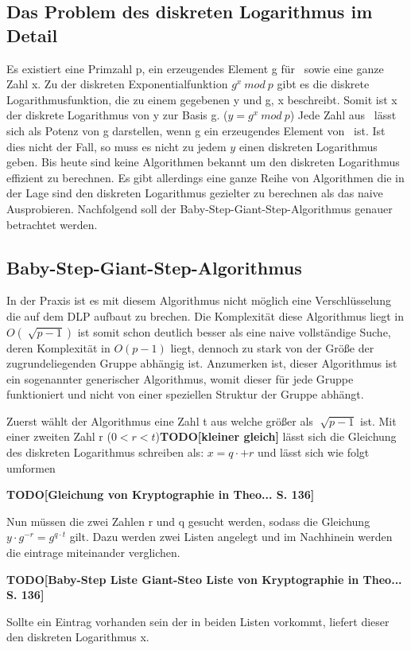 	\subsection{Das Problem des diskreten Logarithmus im Detail}
		Es existiert eine Primzahl p, ein erzeugendes Element g für \myZPStern~sowie eine ganze Zahl x. Zu der diskreten Exponentialfunktion $g^x~mod~p$ gibt es die diskrete Logarithmusfunktion, die zu einem gegebenen y und g, x beschreibt. Somit ist x der diskrete Logarithmus von y zur Basis g. ($y = g^x~mod~p$) Jede Zahl aus \myZPStern~lässt sich als Potenz von g darstellen, wenn g ein erzeugendes Element von \myZPStern~ist. Ist dies nicht der Fall, so muss es nicht zu jedem $y$ \myin \myZPStern einen diskreten Logarithmus geben. Bis heute sind keine Algorithmen bekannt um den diskreten Logarithmus effizient zu berechnen. Es gibt allerdings eine ganze Reihe von Algorithmen die in der Lage sind den diskreten Logarithmus gezielter zu berechnen als das naive Ausprobieren. Nachfolgend soll der Baby-Step-Giant-Step-Algorithmus genauer betrachtet werden.
		
	\subsection{Baby-Step-Giant-Step-Algorithmus}
		In der Praxis ist es mit diesem Algorithmus nicht möglich eine Verschlüsselung die auf dem DLP aufbaut zu brechen. Die Komplexität diese Algorithmus liegt in $O(\sqrt[]{p-1})$ ist somit schon deutlich besser als eine naive vollständige Suche, deren Komplexität in $O(p-1)$ liegt, dennoch zu stark von der Größe der zugrundeliegenden Gruppe abhängig ist. Anzumerken ist, dieser Algorithmus ist ein sogenannter generischer Algorithmus, womit dieser für jede Gruppe funktioniert und nicht von einer speziellen Struktur der Gruppe abhängt.
		
		Zuerst wählt der Algorithmus eine Zahl t \myin {} aus welche größer als $\sqrt[]{p-1}$ ist. Mit einer zweiten Zahl r ($0<r<t$)\textbf{TODO[kleiner gleich]} lässt sich die Gleichung des diskreten Logarithmus schreiben als: $x = q \cdot + r$ und lässt sich wie folgt umformen
		
		\textbf{TODO[Gleichung von Kryptographie in Theo... S. 136]}
		
		Nun müssen die zwei Zahlen r und q gesucht werden, sodass die Gleichung $y \cdot g^{-r} = g^{q \cdot t}$ gilt. Dazu werden zwei Listen angelegt und im Nachhinein werden die eintrage miteinander verglichen. 
		
		\textbf{TODO[Baby-Step Liste Giant-Steo Liste von Kryptographie in Theo... S. 136]}
		
		Sollte ein Eintrag vorhanden sein der in beiden Listen vorkommt, liefert dieser den diskreten Logarithmus x.